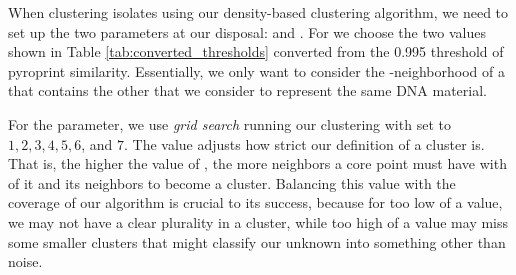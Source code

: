 When clustering \cplop{} isolates using our density-based clustering algorithm, we need to set up the two parameters at our disposal: \minneigh{} and \eps{}.
For \eps{} we choose the two values shown in Table \ref{tab:converted_thresholds} converted from the 0.995 \pearson{} threshold of pyroprint similarity. 
Essentially, we only want to consider the \eps{}-neighborhood of a \pyro{} that contains the other \pyros{} that we consider to represent the same DNA material.

For the \minneigh{} parameter, we use \textit{grid search} running our clustering with \minneigh{} set to $1, 2, 3, 4, 5, 6$, and $7$.
The \minneigh{} value adjusts how strict our definition of a cluster is.
That is, the higher the value of \minneigh{}, the more neighbors a core point must have with \eps{} of it and its neighbors to become a cluster.
Balancing this value with the coverage of our algorithm is crucial to its success, because for too low of a value, we may not have a clear plurality in a cluster, while too high of a value may miss some smaller clusters that might classify our unknown \isol{} into something other than noise.
